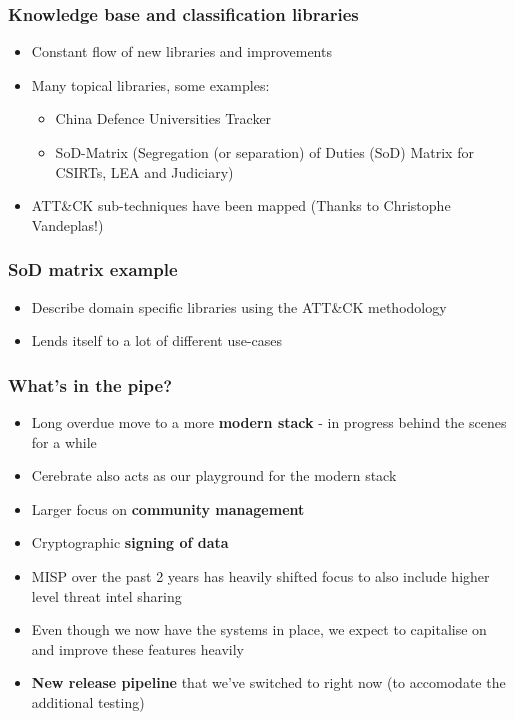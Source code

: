 \begin{frame}
\frametitle{Knowledge base and classification libraries}
\begin{itemize}
	\item Constant flow of new libraries and improvements
        \item Many topical libraries, some examples:
        \begin{itemize}
            \item China Defence Universities Tracker
            \item SoD-Matrix (Segregation (or separation) of Duties (SoD) Matrix for CSIRTs, LEA and Judiciary)
        \end{itemize}
	\item ATT\&CK sub-techniques have been mapped (Thanks to Christophe Vandeplas!)
\end{itemize}
\end{frame}

\begin{frame}
\frametitle{SoD matrix example}
\begin{itemize}
	\item Describe domain specific libraries using the ATT\&CK methodology
        \item Lends itself to a lot of different use-cases
\end{itemize}
\noindent{}
\end{frame}

\begin{frame}
\frametitle{What's in the pipe?}
\begin{itemize}
	\item Long overdue move to a more {\bf modern stack} - in progress behind the scenes for a while
        \item Cerebrate also acts as our playground for the modern stack
        \item Larger focus on {\bf community management}
        \item Cryptographic {\bf signing of data}
        \item MISP over the past 2 years has heavily shifted focus to also include higher level threat intel sharing
        \item Even though we now have the systems in place, we expect to capitalise on and improve these features heavily
        \item {\bf New release pipeline} that we've switched to right now (to accomodate the additional testing)
\end{itemize}
\end{frame}

